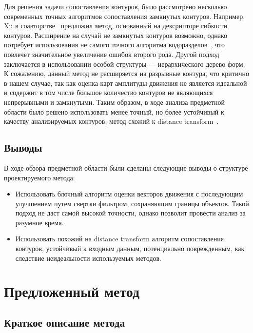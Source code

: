 \documentclass[14pt, a4paper]{extarticle}
\begin{document}
Для решения задачи сопоставления контуров, было рассмотрено несколько современных точных алгоритмов
сопоставления замкнутых контуров. Например, Xu в соавторстве~\cite{xu20092d} предложил метод,
основанный на дексрипторе гибкости контуров. Расширение на случай не замкнутых контуров возможно, 
однако потребует использования не самого точного алгоритма водоразделов~\cite{roerdink2000watershed}, 
что повлечет значительное увеличение ошибок второго рода. Другой 
подход~\cite{felzenszwalb2007hierarchical} заключается в использовании особой структуры ---
иерархического дерево форм. К сожалению, данный метод не расширяется на разрывные контура, 
что критично в нашем случае, так как оценка карт амплитуды движения не является идеальной и содержит
в том числе большое количество контуров не являющихся непрерывными и замкнутыми. Таким образом, 
в ходе анализа предметной области было решено использовать менее точный, но более устойчивый
к качеству анализируемых контуров, метод схожий к distance transform~\cite{borgefors1986distance}.

\subsection{Выводы}

В ходе обзора предметной области были сделаны следующие выводы о структуре проектируемого метода:

\begin{itemize}
	\item Использовать блочный алгоритм оценки векторов движения с последующим улучшением
	путем свертки фильтром, сохраняющим границы объектов. Такой подход не даст самой высокой 
	точности, однако позволит провести анализ за разумное время.
	\item Использовать похожий на distance transform алгоритм сопоставления контуров, устойчивый
	к входным данным, потенциально поврежденным, как следствие неидеальности используемых методов.
\end{itemize}

\newpage
\section{Предложенный метод}

\subsection{Краткое описание метода}


\end{document}

